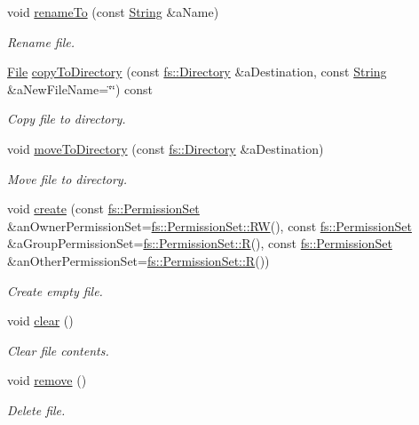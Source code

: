 \begin{DoxyCompactItemize}
void \hyperlink{classlibrary_1_1core_1_1fs_1_1_file_ae65190a612b6958e9e36238e3370c134}{rename\+To} (const \hyperlink{classlibrary_1_1core_1_1types_1_1_string}{String} \&a\+Name)
\begin{DoxyCompactList}\small\item\em Rename file. \end{DoxyCompactList}\item 
\hyperlink{classlibrary_1_1core_1_1fs_1_1_file}{File} \hyperlink{classlibrary_1_1core_1_1fs_1_1_file_a9fd8a0cca72e2414f071d6045c0a1a0d}{copy\+To\+Directory} (const \hyperlink{classlibrary_1_1core_1_1fs_1_1_directory}{fs\+::\+Directory} \&a\+Destination, const \hyperlink{classlibrary_1_1core_1_1types_1_1_string}{String} \&a\+New\+File\+Name=\char`\"{}\char`\"{}) const
\begin{DoxyCompactList}\small\item\em Copy file to directory. \end{DoxyCompactList}\item 
void \hyperlink{classlibrary_1_1core_1_1fs_1_1_file_ac81efdfeb17ea50abe23d96f69bc15ae}{move\+To\+Directory} (const \hyperlink{classlibrary_1_1core_1_1fs_1_1_directory}{fs\+::\+Directory} \&a\+Destination)
\begin{DoxyCompactList}\small\item\em Move file to directory. \end{DoxyCompactList}\item 
void \hyperlink{classlibrary_1_1core_1_1fs_1_1_file_aa0219ae27a3706a1bf9d9afcc7d91830}{create} (const \hyperlink{classlibrary_1_1core_1_1fs_1_1_permission_set}{fs\+::\+Permission\+Set} \&an\+Owner\+Permission\+Set=\hyperlink{classlibrary_1_1core_1_1fs_1_1_permission_set_aed46e87c4c521dd37d7f276d8ca87955}{fs\+::\+Permission\+Set\+::\+RW}(), const \hyperlink{classlibrary_1_1core_1_1fs_1_1_permission_set}{fs\+::\+Permission\+Set} \&a\+Group\+Permission\+Set=\hyperlink{classlibrary_1_1core_1_1fs_1_1_permission_set_a3e14cd99abd197736da0ab7880b1fbec}{fs\+::\+Permission\+Set\+::R}(), const \hyperlink{classlibrary_1_1core_1_1fs_1_1_permission_set}{fs\+::\+Permission\+Set} \&an\+Other\+Permission\+Set=\hyperlink{classlibrary_1_1core_1_1fs_1_1_permission_set_a3e14cd99abd197736da0ab7880b1fbec}{fs\+::\+Permission\+Set\+::R}())
\begin{DoxyCompactList}\small\item\em Create empty file. \end{DoxyCompactList}\item 
void \hyperlink{classlibrary_1_1core_1_1fs_1_1_file_a0b95ab08dd8df2cc28b2e42a72ae0b9a}{clear} ()
\begin{DoxyCompactList}\small\item\em Clear file contents. \end{DoxyCompactList}\item 
void \hyperlink{classlibrary_1_1core_1_1fs_1_1_file_a438408d402b994d76d4de3829ec67dbc}{remove} ()
\begin{DoxyCompactList}\small\item\em Delete file. \end{DoxyCompactList}\end{DoxyCompactItemize}
